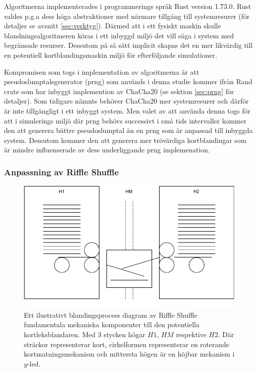 \documentclass[swedish,a4paper]{article}
\begin{document}
Algoritmerna implementerades i programmerings språk Rust version 1.73.0. Rust
valdes p.g.a dess höga abstraktioner med närmare tillgång till systemresurer
(för detaljer se avsnitt \ref{sec:verktyg}). Därmed att i ett fysiskt maskin
skulle blandningsalgoritmeren köras i ett inbyggd miljö det vill säga i system med
begränsade resurser. Dessutom på så sätt implicit skapas det en mer likvärdig till en
potentiell kortblandingsmaskin miljö för efterföljande simulationer. 

Kompromisen som togs i implementation av algoritmerna är att
pseudoslumptalsgenerator (\gls{prng}) som används i denna studie kommer ifrån
Rand \gls{crate} som har inbyggt implemention av ChaCha20 (se sektion
\ref{sec:prng} för detaljer). Som tidigare nämnts behöver ChaCha20 mer
systemresurer och därför är inte tillgängligt i ett inbyggt system. Men
valet av att använda denna togs för att i simulerings miljö där \gls{prng} behövs
successivt i små tids intervaller kommer den att generera bättre pseudoslumptal
än en \gls{prng} som är anpassad till inbyggda system. Dessutom kommer den att
generera mer trövärdiga kortblandingar som är mindre influenserade av dess
underliggande \gls{prng} implemenation. 

\subsubsection{Anpassning av Riffle Shuffle}

 
\begin{figure}
	\centering
	\includegraphics[width=0.9\linewidth]{irl_riffle_shuffle.pdf}
	\captionsetup{width=0.5\textwidth} \caption{Ett ilustrativt blandingsprocess
		diagram av
	Riffle Shuffle fundamentala mekaniska komponenter till den potentiella
	kortleksblandaren. Med 3 stycken högar $H1$, $HM$ respektive $H2$. Där sträckor representerar kort,
	cirkelformen representerar en roterande kortmatningsmekanism och mittersta
	högen är en höjbar mekanism i $y$-led.}
	\label{fig:irl_gsr}
\end{figure}
\end{document}

